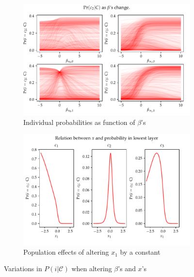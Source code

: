 \begin{figure}[h]
  \begin{center}
  \begin{subfigure}{0.45\linewidth}
    \centering\includegraphics[width=\linewidth]{03_figures/beta_effect.pdf}
    \caption{Individual probabilities as function of $\beta$'s}
  \end{subfigure}
  \begin{subfigure}{0.45\linewidth}
    \centering\includegraphics[width=\linewidth]{03_figures/marginaleffects.pdf}
    \caption{Population effects of altering $x_1$ by a constant}
  \end{subfigure}
  \caption{Variations in $P(i|\mathcal{C})$ when altering $\beta$'s and $x$'s}
  \label{fig: marginalities}
\end{center}
\end{figure}

